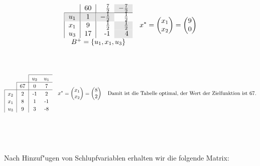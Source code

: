 \documentclass[a4paper,10pt]{article}
\begin{document}
\begin{compactenum} [(a)]
\[\begin{tabular}{ccrr}
			\multicolumn{1}{c|}{}    & \multicolumn{1}{c|}{60} & \multicolumn{1}{r}{$\frac{7}{2}$} & \multicolumn{1}{r}{\cellcolor[gray]{0.9}$-\frac{7}{2}$} \\ \hline
			\multicolumn{1}{|c|}{\cellcolor[gray]{0.9}$u_1$} & \multicolumn{1}{c|}{\cellcolor[gray]{0.9}1} & \cellcolor[gray]{0.9}$-\frac{1}{2}$ & $\frac{1}{2}$ \\
			\multicolumn{1}{|c|}{$x_1$} & \multicolumn{1}{c|}{9} & $\frac{1}{2}$ & \cellcolor[gray]{0.9}$\frac{1}{2}$ \\
			\multicolumn{1}{|c|}{$u_3$} & \multicolumn{1}{c|}{17} & -1 & \cellcolor[gray]{0.9}4\\
			\multicolumn{4}{c}{$B^+ = \{u_1, x_1, u_3\}$}
		\end{tabular}
		\setlength{\extrarowheight}{0pt}
		\quad
		x^* = 
		\begin{pmatrix}
		x_1\\
		x_2
		\end{pmatrix}
		=
		\begin{pmatrix}
		9\\
		0
		\end{pmatrix}
		\]
		\\\
		\[
		\setlength{\extrarowheight}{2pt}
		\begin{tabular}{cccc}
		\cline{3-4}
		& \multicolumn{1}{c|}{}    & \multicolumn{1}{c}{$u_2$} & \multicolumn{1}{c}{$u_1$} \\ \cline{2-4}
		\multicolumn{1}{c|}{}    & \multicolumn{1}{c|}{67} & \multicolumn{1}{c}{0}   & \multicolumn{1}{c}{7} \\ \hline
		\multicolumn{1}{|c|}{$x_2$} & \multicolumn{1}{c|}{2} & -1 & 2\\
		\multicolumn{1}{|c|}{$x_1$} & \multicolumn{1}{c|}{8} & 1 & -1\\
		\multicolumn{1}{|c|}{$u_3$} & \multicolumn{1}{c|}{9} & 3 & -8
		\end{tabular}
		\setlength{\extrarowheight}{0pt}		
		\quad
		x^* = 
		\begin{pmatrix}
		x_1\\
		x_2
		\end{pmatrix}
		=
		\begin{pmatrix}
		8\\
		2
		\end{pmatrix}
		\quad
		\text{Damit ist die Tabelle optimal, der Wert der Zielfunktion ist 67.}
		\]
		\\\\\ 
		\item
		Nach Hinzuf"ugen von Schlupfvariablen erhalten wir die folgende Matrix:\\

\end{compactenum}
\end{document}
